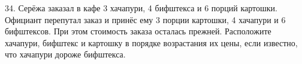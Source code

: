 34. Серёжа заказал в кафе 3 хачапури, 4 бифштекса и 6 порций картошки. Официант перепутал заказ и принёс ему 3 порции картошки, 4 хачапури и 6 бифштексов. При этом стоимость заказа осталась прежней. Расположите хачапури, бифштекс и картошку в порядке возрастания их цены, если известно, что хачапури дороже бифштекса.\\
